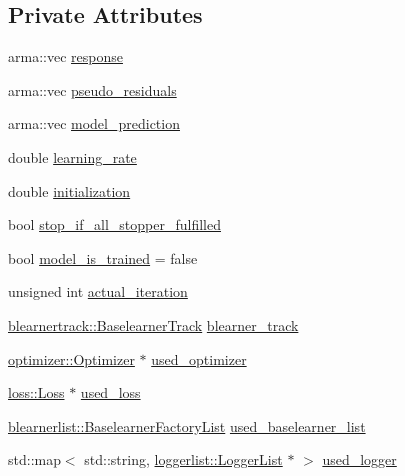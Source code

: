 \subsection*{Private Attributes}
\begin{DoxyCompactItemize}
\item 
arma\+::vec \mbox{\hyperlink{classcboost_1_1_compboost_a01de924b977c9ba12a3f3be88e2586e4}{response}}
\item 
arma\+::vec \mbox{\hyperlink{classcboost_1_1_compboost_acb8716c9e383e15ae7d8785a591860f7}{pseudo\+\_\+residuals}}
\item 
arma\+::vec \mbox{\hyperlink{classcboost_1_1_compboost_a7f7c7fe26c16c175e7d402aca781e8da}{model\+\_\+prediction}}
\item 
double \mbox{\hyperlink{classcboost_1_1_compboost_aa6a7b77188ae60be668e87018d28835a}{learning\+\_\+rate}}
\item 
double \mbox{\hyperlink{classcboost_1_1_compboost_a2056c4035d5e0d8b0dcb4daedfadee16}{initialization}}
\item 
bool \mbox{\hyperlink{classcboost_1_1_compboost_a40c118dcaf96479cd6574138f9b2620f}{stop\+\_\+if\+\_\+all\+\_\+stopper\+\_\+fulfilled}}
\item 
bool \mbox{\hyperlink{classcboost_1_1_compboost_af1da66c1def3edd484f5d30b36e64eeb}{model\+\_\+is\+\_\+trained}} = false
\item 
unsigned int \mbox{\hyperlink{classcboost_1_1_compboost_a3db81c285c1cd238d0fb65dfc6c00439}{actual\+\_\+iteration}}
\item 
\mbox{\hyperlink{classblearnertrack_1_1_baselearner_track}{blearnertrack\+::\+Baselearner\+Track}} \mbox{\hyperlink{classcboost_1_1_compboost_af9c2787818f591941f74af0059ca7dc9}{blearner\+\_\+track}}
\item 
\mbox{\hyperlink{classoptimizer_1_1_optimizer}{optimizer\+::\+Optimizer}} $\ast$ \mbox{\hyperlink{classcboost_1_1_compboost_a6c0311a05cf6128b4c76fabbc432b807}{used\+\_\+optimizer}}
\item 
\mbox{\hyperlink{classloss_1_1_loss}{loss\+::\+Loss}} $\ast$ \mbox{\hyperlink{classcboost_1_1_compboost_a9c776faf5e9b9e99b5241f2a650d5242}{used\+\_\+loss}}
\item 
\mbox{\hyperlink{classblearnerlist_1_1_baselearner_factory_list}{blearnerlist\+::\+Baselearner\+Factory\+List}} \mbox{\hyperlink{classcboost_1_1_compboost_ac4c690473dc39e10e84ae9d9219b1fa1}{used\+\_\+baselearner\+\_\+list}}
\item 
std\+::map$<$ std\+::string, \mbox{\hyperlink{classloggerlist_1_1_logger_list}{loggerlist\+::\+Logger\+List}} $\ast$ $>$ \mbox{\hyperlink{classcboost_1_1_compboost_a05590928bf741eecb135f32da339ceaa}{used\+\_\+logger}}
\end{DoxyCompactItemize}


